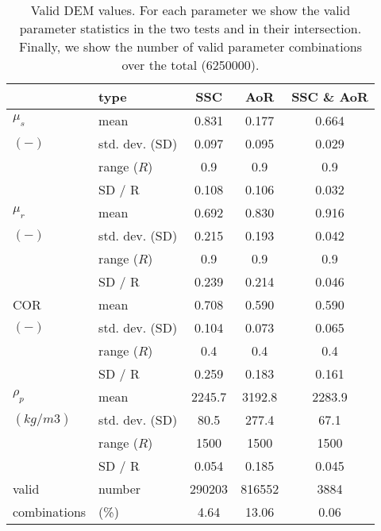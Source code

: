 \documentclass{llncs}
\begin{document}
\begin{table}[h]
\centering
\begin{tabular}{llccc}
\hline

          & type  & SSC & AoR   & SSC \& AoR \\
          \hline

    $\mu_s$ & mean  & 0.831 & 0.177 & 0.664 \\
    $(-)$   & std. dev. (SD) & 0.097 & 0.095 & 0.029 \\
          & range ($R$) & 0.9   & 0.9   & 0.9 \\
          & SD / R & 0.108 & 0.106 & 0.032 \\
          \hline
    $\mu_r$ & mean  & 0.692 & 0.830 & 0.916 \\
    $(-)$   & std. dev. (SD) & 0.215 & 0.193 & 0.042 \\
          & range ($R$) & 0.9   & 0.9   & 0.9 \\
          & SD / R & 0.239 & 0.214 & 0.046 \\
          \hline
              COR   & mean  & 0.708 & 0.590 & 0.590 \\
    $(-)$   & std. dev. (SD) & 0.104 & 0.073 & 0.065 \\
          & range ($R$) & 0.4   & 0.4   & 0.4 \\
          & SD / R & 0.259 & 0.183 & 0.161 \\
          \hline
    $\rho_p$ & mean  & 2245.7 & 3192.8 & 2283.9 \\
    $(kg/m3)$ & std. dev. (SD) & 80.5  & 277.4 & 67.1 \\
          & range ($R$) & 1500  & 1500  & 1500 \\
          & SD / R & 0.054 & 0.185 & 0.045 \\
          \hline
    valid & number & 290203 & 816552 & 3884 \\
    combinations & (\%) & 4.64  & 13.06 & 0.06 \\  

\hline
\end{tabular}
\caption[Valid DEM values]{Valid DEM values. For each parameter we show the
valid parameter statistics in the two tests and in their intersection.
Finally, we show the number of valid parameter combinations over the total
(6250000).}
\label{tab:13DEMvalidvalues}
\end{table}
\end{document}
